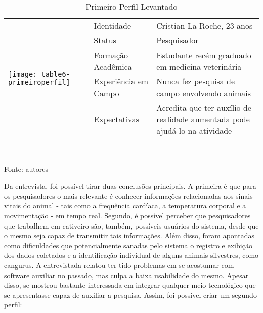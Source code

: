 \begin{table}[ht]
\centering
\caption{Primeiro Perfil Levantado}
\vspace{0.5cm}
\begin{tabular}{| l | l | m{8cm} |}
\hline
\multirow{5}{*}{\texttt{[image: table6-primeiroperfil]}} & Identidade & Cristian La Roche, 23 anos\\ \cline{2-3}
& Status & Pesquisador\\%
& Formação Acadêmica & Estudante recém graduado em medicina veterinária\\ %
& Experiência em Campo & Nunca fez pesquisa de campo envolvendo animais\\ %
& Expectativas & Acredita que ter auxílio de realidade aumentada pode ajudá-lo na atividade\\ %
\hline
\end{tabular}
\vspace{0.4cm}\\
\centerline{\small{Fonte: autores}}
\end{table}

\FloatBarrier

Da entrevista, foi possível tirar duas conclusões principais. A primeira é que para os pesquisadores o mais relevante é conhecer informações relacionadas aos sinais vitais do animal - tais como a frequência cardíaca, a temperatura corporal e a movimentação - em tempo real. Segundo, é possível perceber que pesquisadores que trabalhem em cativeiro são, também, possíveis usuários do sistema, desde que o mesmo seja capaz de transmitir tais informações.
Além disso, foram apontadas como dificuldades que potencialmente sanadas pelo sistema o registro e exibição dos dados coletados e a identificação individual de alguns animais silvestres, como cangurus.
A entrevistada relatou ter tido problemas em se acostumar com software auxiliar no passado, mas culpa a baixa usabilidade do mesmo. Apesar disso, se mostrou bastante interessada em integrar qualquer meio tecnológico que se apresentasse capaz de auxiliar a pesquisa.
Assim, foi possível criar um segundo perfil:

